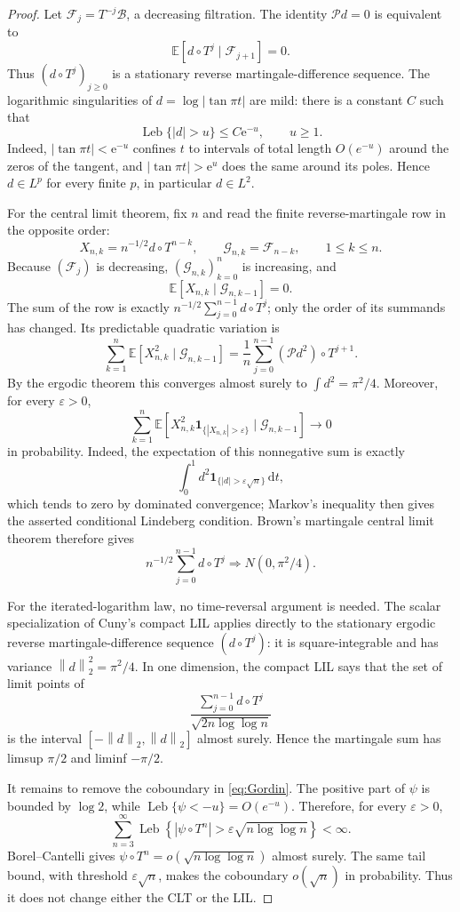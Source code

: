 \documentclass[11pt,oneside]{article}
\numberwithin{equation}{section}
\theoremstyle{definition}
\theoremstyle{remark}
\newcommand{\e}{\mathrm e}
\newcommand{\dd}{\,\mathrm d}
\newcommand{\abs}[1]{\left|#1\right|}
\newcommand{\norm}[1]{\left\lVert#1\right\rVert}
\newcommand{\Leb}{\operatorname{Leb}}
\newcommand{\Eop}{\mathbb E}
\newcommand{\Perron}{\mathcal P}
\begin{document}
\begin{proof}
Let \(\mathcal F_j=T^{-j}\mathcal B\), a decreasing filtration.  The identity
\(\Perron d=0\) is equivalent to
\[
 \Eop[d\circ T^j\mid\mathcal F_{j+1}]=0.
\]
Thus \((d\circ T^j)_{j\ge0}\) is a stationary reverse martingale-difference sequence.
The logarithmic singularities of \(d=\log|\tan\pi t|\) are mild: there is a constant \(C\)
such that
\[
 \Leb\{\abs d>u\}\le C\e^{-u},\qquad u\ge1.
\]
Indeed, \(|\tan\pi t|<\e^{-u}\) confines \(t\) to intervals of total length
\(O(e^{-u})\) around the zeros of the tangent, and
\(|\tan\pi t|>\e^u\) does the same around its poles.  Hence \(d\in L^p\) for every finite
\(p\), in particular \(d\in L^2\).

For the central limit theorem, fix \(n\) and read the finite reverse-martingale row in the
opposite order:
\[
 X_{n,k}=n^{-1/2}d\circ T^{n-k},
 \qquad
 \mathcal G_{n,k}=\mathcal F_{n-k},
 \qquad 1\le k\le n.
\]
Because \((\mathcal F_j)\) is decreasing, \((\mathcal G_{n,k})_{k=0}^n\) is increasing, and
\[
 \Eop[X_{n,k}\mid\mathcal G_{n,k-1}]=0.
\]
The sum of the row is exactly \(n^{-1/2}\sum_{j=0}^{n-1}d\circ T^j\); only the order of its
summands has changed.  Its predictable quadratic variation is
\[
 \sum_{k=1}^n\Eop[X_{n,k}^2\mid\mathcal G_{n,k-1}]
 =\frac1n\sum_{j=0}^{n-1}(\Perron d^2)\circ T^{j+1}.
\]
By the ergodic theorem this converges almost surely to
\(\int d^2=\pi^2/4\).  Moreover, for every \(\varepsilon>0\),
\[
 \sum_{k=1}^n
 \Eop\!\left[X_{n,k}^2\mathbf 1_{\{|X_{n,k}|>\varepsilon\}}
       \mid\mathcal G_{n,k-1}\right]
 \longrightarrow0
\]
in probability.  Indeed, the expectation of this nonnegative sum is exactly
\[
 \int_0^1 d^2\mathbf 1_{\{|d|>\varepsilon\sqrt n\}}\dd t,
\]
which tends to zero by dominated convergence; Markov's inequality then gives the asserted
conditional Lindeberg condition.  Brown's martingale central limit theorem therefore gives
\[
 n^{-1/2}\sum_{j=0}^{n-1}d\circ T^j
 \Longrightarrow N(0,\pi^2/4).
\]

For the iterated-logarithm law, no time-reversal argument is needed.  The scalar
specialization of Cuny's compact LIL applies directly to the stationary ergodic reverse
martingale-difference sequence \((d\circ T^j)\): it is square-integrable and has variance
\(\norm d_2^2=\pi^2/4\).  In one dimension, the compact LIL says that the set of limit
points of
\[
 \frac{\sum_{j=0}^{n-1}d\circ T^j}{\sqrt{2n\log\log n}}
\]
is the interval \([ -\norm d_2,\norm d_2]\) almost surely.  Hence the martingale sum has
limsup \(\pi/2\) and liminf \(-\pi/2\).

It remains to remove the coboundary in \eqref{eq:Gordin}.  The positive part of \(\psi\) is
bounded by \(\log2\), while
\(\Leb\{\psi<-u\}=O(e^{-u})\).  Therefore, for every \(\varepsilon>0\),
\[
 \sum_{n=3}^{\infty}
 \Leb\left\{\abs{\psi\circ T^n}>
 \varepsilon\sqrt{n\log\log n}\right\}<\infty.
\]
Borel--Cantelli gives
\(\psi\circ T^n=o(\sqrt{n\log\log n})\) almost surely.  The same tail bound, with
threshold \(\varepsilon\sqrt n\), makes the coboundary \(o(\sqrt n)\) in probability.
Thus it does not change either the CLT or the LIL.
\end{proof}
\end{document}
